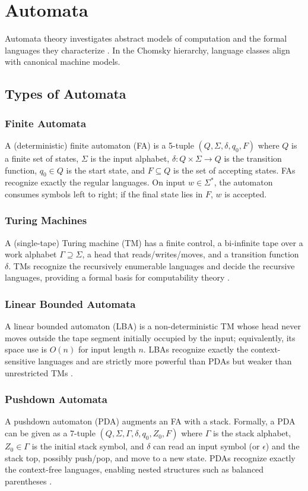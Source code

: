 \section{Automata}
Automata theory investigates abstract models of computation and the formal languages they characterize \cite{cit4}. In the Chomsky hierarchy, language 
classes align with canonical machine models.

\subsection{Types of Automata}

\subsubsection{Finite Automata}
A (deterministic) finite automaton (FA) is a 5-tuple $(Q,\Sigma,\delta,q_0,F)$ where $Q$ is a finite set of states, $\Sigma$ is the input alphabet, 
$\delta: Q \times \Sigma \to Q$ is the transition function, $q_0 \in Q$ is the start state, and $F \subseteq Q$ is the set of accepting states. 
FAs recognize exactly the regular languages. On input $w \in \Sigma^*$, the automaton consumes symbols left to right; if the final state lies in $F$, $w$ 
is accepted.

\subsubsection{Turing Machines}
A (single-tape) Turing machine (TM) has a finite control, a bi-infinite tape over a work alphabet $\Gamma \supseteq \Sigma$, a head that reads/writes/moves,
 and a transition function $\delta$. TMs recognize the recursively enumerable languages and decide the recursive languages, providing a formal basis for 
 computability theory \cite{cit5}.

\subsubsection{Linear Bounded Automata}
A linear bounded automaton (LBA) is a non-deterministic TM whose head never moves outside the tape segment initially occupied by the input; equivalently, 
its space use is $O(n)$ for input length $n$. LBAs recognize exactly the context-sensitive languages and are strictly more powerful than PDAs but weaker 
than unrestricted TMs \cite{cit5}.

\subsubsection{Pushdown Automata}
A pushdown automaton (PDA) augments an FA with a stack. Formally, a PDA can be given as a 7-tuple $(Q,\Sigma,\Gamma,\delta,q_0,Z_0,F)$ where $\Gamma$ is 
the stack alphabet, $Z_0 \in \Gamma$ is the initial stack symbol, and $\delta$ can read an input symbol (or $\epsilon$) and the stack top, possibly push/pop,
and move to a new state. PDAs recognize exactly the context-free languages, enabling nested structures such as balanced parentheses \cite{cit5}.

